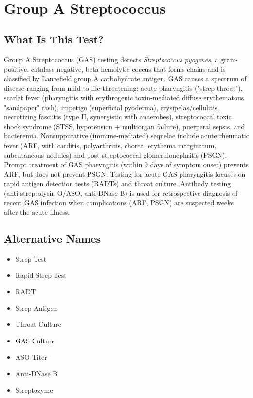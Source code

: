 \chapter{Group A Streptococcus}

\section*{What Is This Test?}
Group A Streptococcus (GAS) testing detects \textit{Streptococcus pyogenes}, a gram-positive, catalase-negative, beta-hemolytic coccus that forms chains and is classified by Lancefield group A carbohydrate antigen. GAS causes a spectrum of disease ranging from mild to life-threatening: acute pharyngitis ("strep throat"), scarlet fever (pharyngitis with erythrogenic toxin-mediated diffuse erythematous "sandpaper" rash), impetigo (superficial pyoderma), erysipelas/cellulitis, necrotizing fasciitis (type II, synergistic with anaerobes), streptococcal toxic shock syndrome (STSS, hypotension + multiorgan failure), puerperal sepsis, and bacteremia. Nonsuppurative (immune-mediated) sequelae include acute rheumatic fever (ARF, with carditis, polyarthritis, chorea, erythema marginatum, subcutaneous nodules) and post-streptococcal glomerulonephritis (PSGN). Prompt treatment of GAS pharyngitis (within 9 days of symptom onset) prevents ARF, but does not prevent PSGN. Testing for acute GAS pharyngitis focuses on rapid antigen detection tests (RADTs) and throat culture. Antibody testing (anti-streptolysin O/ASO, anti-DNase B) is used for retrospective diagnosis of recent GAS infection when complications (ARF, PSGN) are suspected weeks after the acute illness.

\section*{Alternative Names}
\begin{itemize}
  \item Strep Test
  \item Rapid Strep Test
  \item RADT
  \item Strep Antigen
  \item Throat Culture
  \item GAS Culture
  \item ASO Titer
  \item Anti-DNase B
  \item Streptozyme
\end{itemize}

